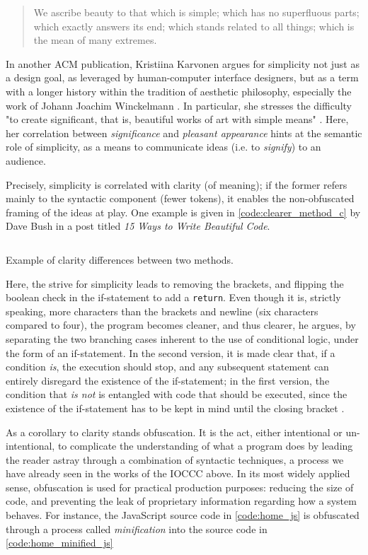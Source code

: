\begin{quote}
  We ascribe beauty to that which is simple; which has no superfluous parts; which exactly answers its end; which stands related to all things; which is the mean of many extremes. \citep{gibbons_beauty_2012}
\end{quote}

In another ACM publication, Kristiina Karvonen argues for simplicity not just as a design goal, as leveraged by human-computer interface designers, but as a term with a longer history within the tradition of aesthetic philosophy, especially the work of Johann Joachim Winckelmann \citep{karvonen_beauty_2000}. In particular, she stresses the difficulty "to create significant, that is, beautiful works of art with simple means" \citep{karvonen_beauty_2000}. Here, her correlation between \emph{significance} and \emph{pleasant appearance} hints at the semantic role of simplicity, as a means to communicate ideas (i.e. to \emph{signify}) to an audience.

Precisely, simplicity is correlated with clarity (of meaning); if the former refers mainly to the syntactic component (fewer tokens), it enables the non-obfuscated framing of the ideas at play. One example is given in \ref{code:clearer_method_c} by Dave Bush in a post titled  \emph{15 Ways to Write Beautiful Code}.

\begin{listing}
  \inputminted{c}{./corpus/clearer_method.c}
  \caption{Example of clarity differences between two methods.}
  \label{code:clearer_method_c}
\end{listing}

Here, the strive for simplicity leads to removing the brackets, and flipping the boolean check in the if-statement to add a \lstinline{return}. Even though it is, strictly speaking, more characters than the brackets and newline (six characters compared to four), the program becomes cleaner, and thus clearer, he argues, by separating the two branching cases inherent to the use of conditional logic, under the form of an if-statement. In the second version, it is made clear that, if a condition \emph{is}, the execution should stop, and any subsequent statement can entirely disregard the existence of the if-statement; in the first version, the condition that \emph{is not} is entangled with code that should be executed, since the existence of the if-statement has to be kept in mind until the closing bracket \citep{bush_15_2015}.

As a corollary to clarity stands obfuscation. It is the act, either intentional or un-intentional, to complicate the understanding of what a program does by leading the reader astray through a combination of syntactic techniques, a process we have already seen in the works of the IOCCC above. In its most widely applied sense, obfuscation is used for practical production purposes: reducing the size of code, and preventing the leak of proprietary information regarding how a system behaves. For instance, the JavaScript source code in \ref{code:home_js} is obfuscated through a process called \emph{minification} into the source code in \ref{code:home_minified_js}

